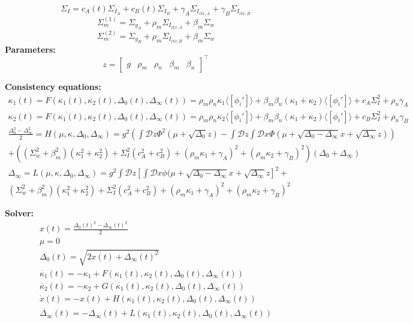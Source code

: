 \documentclass[11pt]{article}
\begin{document}
\[\Sigma_I = c_A(t)\Sigma_{I_A} + c_B(t)\Sigma_{I_B} + \gamma_A \Sigma_{I_{ctx,A}} +  \gamma_B \Sigma_{I_{ctx,B}} \]
\[\Sigma_m^{(1)} = \Sigma_{y_A} + \rho_m \Sigma_{I_{ctx,A}} + \beta_m \Sigma_w \]
\[\Sigma_m^{(2)} = \Sigma_{y_B} + \rho_m \Sigma_{I_{ctx,B}} + \beta_m \Sigma_w \]
\textbf{Parameters:} \\
\[z = \begin{bmatrix} g  & \rho_m & \rho_n & \beta_m & \beta_n \end{bmatrix}^\top \]

\textbf{Consistency equations:} \\ 
\begin{equation}
\begin{split}
\kappa_1(t) = F(\kappa_1(t), \kappa_2(t), \Delta_0(t), \Delta_\infty(t)) = \rho_m \rho_n \kappa_1 \langle \left[ \phi_i' \right] \rangle +\beta_m \beta_n(\kappa_1 + \kappa_2) \langle \left[ \phi_i' \right] \rangle + c_A \Sigma_I^2 + \rho_n \gamma_A \\
\kappa_2(t) = F(\kappa_1(t), \kappa_2(t), \Delta_0(t), \Delta_\infty(t)) = \rho_m \rho_n \kappa_2 \langle \left[ \phi_i' \right] \rangle +\beta_m \beta_n(\kappa_1 + \kappa_2) \langle \left[ \phi_i' \right] \rangle + c_B \Sigma_I^2 + \rho_n \gamma_B \\
 \frac{\Delta_0^2-\Delta_\infty^2}{2} = H(\mu, \kappa, \Delta_0, \Delta_\infty) = g^2 \left( \int \mathcal{D}z \Phi^2(\mu + \sqrt{\Delta_0}z) - \int \mathcal{D}z \int \mathcal{D}x \Phi(\mu + \sqrt{\Delta_0 - \Delta_\infty}x + \sqrt{\Delta_\infty}z)  \right) \\
+ ((\Sigma_w^2 + \beta_m^2)(\kappa_1^2 + \kappa_2^2) + \Sigma_I^2(c_A^2 + c_B^2) + (\rho_m \kappa_1 + \gamma_A)^2 + (\rho_m \kappa_2 + \gamma_B)^2)(\Delta_0 + \Delta_\infty) \\
\Delta_\infty = L(\mu, \kappa, \Delta_0, \Delta_\infty)  = g^2 \int \mathcal{D}z \left[ \int \mathcal{D}x \phi(\mu + \sqrt{\Delta_0 - \Delta_\infty}x + \sqrt{\Delta_\infty}z \right]^2 + \\
(\Sigma_w^2 + \beta_m^2)(\kappa_1^2 + \kappa_2^2) + \Sigma_I^2(c_A^2 + c_B^2) + (\rho_m \kappa_1 + \gamma_A)^2 + (\rho_m \kappa_2 + \gamma_B)^2
\end{split} 
\end{equation}

\textbf{Solver:}
\begin{equation}
\begin{split}
x(t) = \frac{\Delta_0(t)^2-\Delta_\infty(t)^2}{2} \\
\mu = 0 \\
\Delta_0(t) = \sqrt{2x(t) + \Delta_\infty(t)^2} \\
\dot{\kappa_1}(t) = -\kappa_1 + F(\kappa_1(t), \kappa_2(t), \Delta_0(t), \Delta_\infty(t)) \\
\dot{\kappa_2}(t) = -\kappa_2 + G(\kappa_1(t), \kappa_2(t), \Delta_0(t), \Delta_\infty(t)) \\
\dot{x}(t) = -x(t) + H(\kappa_1(t), \kappa_2(t), \Delta_0(t), \Delta_\infty(t)) \\
\dot{\Delta_\infty}(t) = -\Delta_\infty(t) + L(\kappa_1(t), \kappa_2(t), \Delta_0(t), \Delta_\infty(t))
\end{split}
\end{equation}
\end{document}
